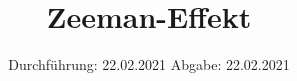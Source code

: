 

\subject{Nr. 27}
\title{Zeeman-Effekt}
\date{%
  Durchführung: 22.02.2021
  \hspace{3em}
  Abgabe: 22.02.2021
}



\maketitle
\thispagestyle{empty}
\tableofcontents
\newpage






\printbibliography{}


